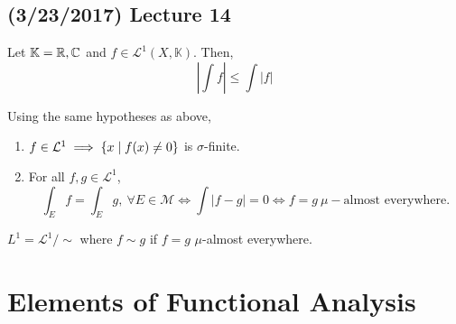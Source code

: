 \documentclass[11pt,leqno,oneside]{amsbook}
\numberwithin{thm}{section}
\newcommand{\M}{\mathcal{M}}
\newcommand{\cL}{\mathcal{L}}
\begin{document}
\subsection*{(3/23/2017) Lecture 14}
\begin{prop}
  Let \(\mathbb{K} = {\mathbb R},{\mathbb C}\) and \(f \in
  \cL^1(X,\mathbb{K})\). Then, \[
    \left| \int f \right| \leq \int \left| f \right|
  \]
\end{prop}
\begin{prop}
  Using the same hypotheses as above,
  \begin{enumerate}
  \item \(f \in \cL^1 \implies \{x \st f(x) \neq 0\}\) is
    \(\sigma\)-finite.
  \item For all \(f,g \in \cL^1\), \[
      \int_E f = \int_E g, \ \forall E \in \M \iff \int |f-g| = 0 \iff
      f=g \ \mu-\text{almost everywhere}.
    \]
  \end{enumerate}

\end{prop}
\begin{defn}
  \(L^1 = \cL^1/\sim\) where \(f \sim g\) if \(f=g\) \(\mu\)-almost everywhere.
\end{defn}
\section{Elements of Functional Analysis}
\end{document}
